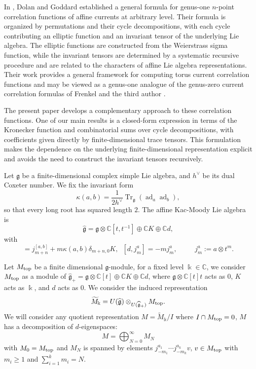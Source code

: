 \documentclass[11pt,a4paper]{amsart}
\numberwithin{equation}{section}
\theoremstyle{definition}
\theoremstyle{remark}
\DeclareMathOperator{\Tr}{Tr}
\DeclareMathOperator{\ad}{ad}
\newcommand{\CC}{\mathbb C}
\newcommand{\g}{\mathfrak g}
\newcommand{\kk}{\Bbbk}
\begin{document}
In \cite{DolanGoddard}, Dolan and Goddard established a general formula for genus-one $n$-point correlation functions of affine currents at arbitrary level. Their formula is organized by permutations and their cycle decompositions, with each cycle contributing an elliptic function and an invariant tensor of the underlying Lie algebra. The elliptic functions are constructed from the Weierstrass sigma function, while the invariant tensors are determined by a systematic recursive procedure and are related to the characters of affine Lie algebra representations. Their work provides a general framework for computing torus current correlation functions and may be viewed as a genus-one analogue of the genus-zero current correlation formulas of Frenkel and the third author \cite{FrenkelZhu}.

The present paper develops a complementary approach to these correlation functions. One of our main results is a closed-form expression in terms of the Kronecker function and combinatorial sums over cycle decompositions, with coefficients given directly by finite-dimensional trace tensors. This formulation makes the dependence on the underlying finite-dimensional representation explicit and avoids the need to construct the invariant tensors recursively.


Let $\g$ be a finite-dimensional complex simple Lie algebra, and 
$h^\vee$ be its dual Coxeter number.  We fix the invariant form
\begin{equation}
\kappa(a,b)=\frac{1}{2h^\vee}\Tr_{\g}(\ad_a\ad_b),
\label{eq:normalized-form}
\end{equation}
so that every long root has squared length $2$.  The affine Kac-Moody Lie algebra is
\begin{equation*}
\widehat{\g}=\g\otimes\CC[t,t^{-1}]\oplus\CC K \oplus \CC d,
\end{equation*}
with
\begin{equation}
[j_m^a,j_n^b]=j_{m+n}^{[a,b]}+m\kappa(a,b)\delta_{m+n,0}K, \; \; [ d , j_m^a  ] = - m j_m^a , \; \; 
\qquad j_m^a:=a\otimes t^m.
\label{eq:affine-bracket-universal}
\end{equation}


Let $ M_{\rm top}$ be a finite dimensional $\g $-module, for a fixed level $ \kk  \in\CC$, 
we consider  $ M_{\rm top}$  as a module of $ 	\widehat{\g}_+ = \g\otimes\CC[t]  \oplus\CC K \oplus \CC d    $, where $ \g \otimes \CC [ t ] t $ 
acts as $0$, $K$ acts as $\kk$, and $ d $ acts as $ 0 $. We consider the induced representation 
\[  \widetilde{ M}_{\kk }  =   U ( \widehat{\g} )   \otimes_{ U ( \widehat{\g}_+ ) } M_{\rm top} . \]
We will consider any quotient representation $ M =  \widetilde{ M}_{ \kk  } /  I $ where $ I \cap M_{\rm top} = 0 $,
$M$  has a decomposition of $d$-eigenspaces:
\[   M   =  \bigoplus_{N=0}^{\infty}  M_N    \]
with $M_{0} = M_{\rm top}$ and $ M_N $ is spanned by elements
$   j_{-m_1}^{a_1} \cdots j_{-m_k}^{a_k}  v $, $v\in M_{\rm top}$ with $ m_i \geq 1 $ and $ \sum_{ i=1}^k  m _i = N $. 
\end{document}
